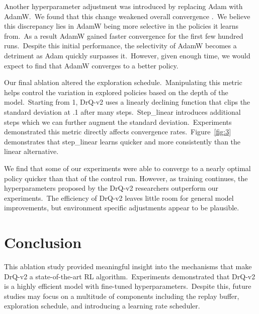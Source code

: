 \documentclass[conference]{./IEEEtran/IEEEtran} %
\begin{document}
    Another hyperparameter adjustment was introduced by replacing Adam with AdamW.\ We found that this change weakened overall
    convergence .\ We believe this discrepancy lies in AdamW being more selective in the policies it learns from.\ As a result
    AdamW gained faster convergence for the first few hundred runs.\ Despite this initial performance, the selectivity of AdamW
    becomes a detriment as Adam quickly surpasses it.\ However, given enough time, we would expect to find that AdamW converges
    to a better policy.\

    Our final ablation altered the exploration schedule.\ Manipulating this metric helps control the variation in explored policies
    based on the depth of the model.\ Starting from 1, DrQ-v2 uses a linearly declining function that clips the standard deviation
    at .1 after many steps.\ Step\_linear introduces additional steps which we can further augment the standard deviation.\ Experiments
    demonstrated this metric directly affects convergence rates.\ Figure~\ref{fig:3} demonstrates that step\_linear learns quicker
    and more consistently than the linear alternative.\

    We find that some of our experiments were able to converge to a nearly optimal policy quicker than that of the control run.
    However, as training continues, the hyperparameters proposed by the DrQ-v2 researchers outperform our experiments.\ The efficiency
    of DrQ-v2 leaves little room for general model improvements, but environment specific adjustments appear to be plausible.



    \section{Conclusion}\label{sec:conclusion}

    This ablation study provided meaningful insight into the mechanisms that make DrQ-v2 a state-of-the-art RL algorithm.\ Experiments
    demonstrated that DrQ-v2 is a highly efficient model with fine-tuned hyperparameters.\ Despite this, future studies may
    focus on a multitude of components including the replay buffer, exploration schedule, and introducing a learning rate scheduler.


    
    
\end{document}
